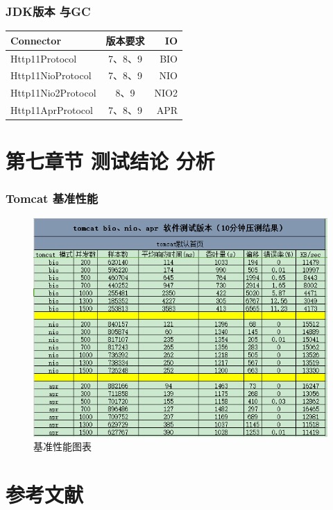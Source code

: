 \documentclass{beamer}
\begin{document}
\begin{frame}[allowframebreaks]
\frametitle{JDK版本 与GC}
\centering
\begin{tabular}{|l|c|r|}
\hline 
\large	Connector&  \large 版本要求&  \large IO \\
\hline 
Http11Protocol & 7、8、9 & BIO \\
\hline 
Http11NioProtocol & 7、8、9 & NIO \\
\hline 
Http11Nio2Protocol & 8、9& NIO2  \\
\hline 
Http11AprProtocol& 7、8、9 & APR \\
\hline
\end{tabular}
\end{frame}




\section{第七章节 测试结论 分析}



\begin{frame}
\frametitle{Tomcat 基准性能}
\begin{figure}[ht]

\centering
\includegraphics[scale=0.45]{img/benchmark.png}
\caption{基准性能图表}
\label{fig:pathdemo1}
\end{figure}

\end{frame}


\section{参考文献}
\end{document}

